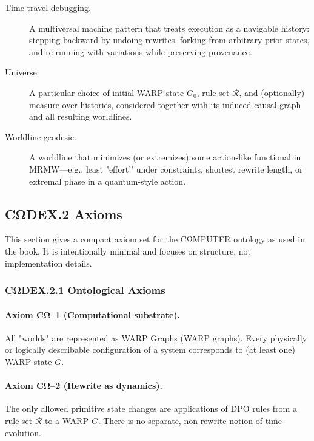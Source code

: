 \begin{description}
  \item[Time-travel debugging.]
    A multiversal machine pattern that treats execution as a navigable
    history: stepping backward by undoing rewrites, forking from arbitrary
    prior states, and re-running with variations while preserving
    provenance.

  \item[Universe.]
    A particular choice of initial WARP state $G_0$, rule set $\mathcal{R}$,
    and (optionally) measure over histories, considered together with its
    induced causal graph and all resulting worldlines.

  \item[Worldline geodesic.]
    A worldline that minimizes (or extremizes) some action-like functional
    in MRMW—e.g., least "effort’’ under constraints, shortest rewrite
    length, or extremal phase in a quantum-style action.

\end{description}

\subsection*{CΩDEX.2 \quad Axioms}

This section gives a compact axiom set for the CΩMPUTER ontology as used
in the book. It is intentionally minimal and focuses on structure, not
implementation details.

\subsubsection*{CΩDEX.2.1 \quad Ontological Axioms}

\paragraph{Axiom CΩ–1 (Computational substrate).}
All "worlds" are represented as WARP Graphs (WARP graphs).
Every physically or logically describable configuration of a system
corresponds to (at least one) WARP state $G$.

\paragraph{Axiom CΩ–2 (Rewrite as dynamics).}
The only allowed primitive state changes are applications of DPO rules
from a rule set $\mathcal{R}$ to a WARP $G$. There is no separate,
non-rewrite notion of time evolution.

